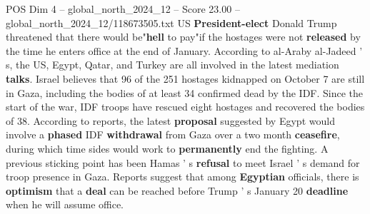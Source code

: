 \begin{textsample}{POS Dim 4 – global\_north\_2024\_12 – Score 23.00 – global\_north\_2024\_12/118673505.txt}
US \textbf{President-elect} Donald Trump threatened that there would be"\textbf{hell} to pay"if the hostages were not \textbf{released} by the time he enters office at the end of January.
According to al-Araby al-Jadeed ' s, the US, Egypt, Qatar, and Turkey are all involved in the latest mediation \textbf{talks}.
Israel believes that 96 of the 251 hostages kidnapped on October 7 are still in Gaza, including the bodies of at least 34 confirmed dead by the IDF.
Since the start of the war, IDF troops have rescued eight hostages and recovered the bodies of 38.
According to reports, the latest \textbf{proposal} suggested by Egypt would involve a \textbf{phased} IDF \textbf{withdrawal} from Gaza over a two month \textbf{ceasefire}, during which time sides would work to \textbf{permanently} end the fighting.
A previous sticking point has been Hamas ' s \textbf{refusal} to meet Israel ' s demand for troop presence in Gaza.
Reports suggest that among \textbf{Egyptian} officials, there is \textbf{optimism} that a \textbf{deal} can be reached before Trump ' s January 20 \textbf{deadline} when he will assume office.

\end{textsample}
